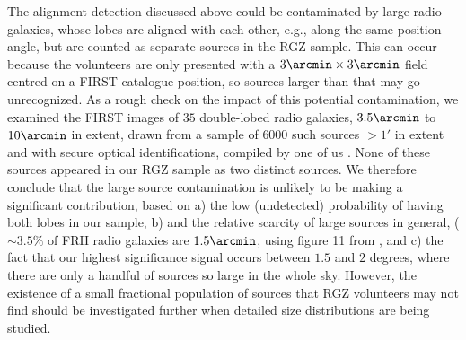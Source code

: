 	The alignment detection discussed above could be contaminated by large radio galaxies, whose lobes are aligned with each other, e.g., along the same position angle, but are counted as separate sources in the RGZ sample.  This can occur because the volunteers are only presented with a $3\arcmin \times 3\arcmin$ field centred on a FIRST catalogue position, so sources larger than that may go unrecognized.  As a rough check on the impact of this potential contamination, we examined the FIRST images of $35$ double-lobed radio galaxies, $3.5\arcmin$ to $10\arcmin$ in extent, drawn from a sample of $6000$  such sources $>1'$ in extent and with secure optical identifications, compiled by one of us \citep[HA, see e.g.,][]{Andernach2012}.  None of these sources appeared in our RGZ sample as two distinct sources.  We therefore conclude that the large source contamination is unlikely to be making a significant contribution, based on a) the low (undetected) probability of having both lobes in our sample, b) and the relative scarcity of large sources in general, ($\sim 3.5\%$ of FRII radio galaxies are $ 1.5\arcmin$, using figure 11 from \citep{Overzier2003}, and c) the fact that our highest significance signal occurs between $1.5$ and $2$ degrees, where there are only a handful of sources so large in the whole sky.  However, the existence of a small fractional population of sources that RGZ volunteers may not find should be investigated further when detailed size distributions are being studied.